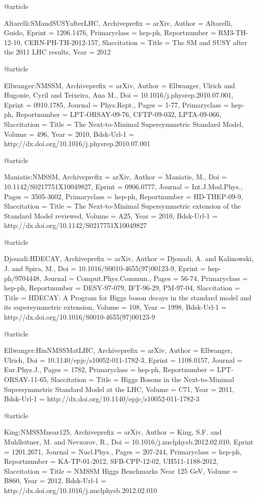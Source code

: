 {{{{{{{{{{{{{{@article{Altarelli:SMandSUSYafterLHC,
	Archiveprefix = {arXiv},
	Author = {Altarelli, Guido},
	Eprint = {1206.1476},
	Primaryclass = {hep-ph},
	Reportnumber = {RM3-TH-12-10, CERN-PH-TH-2012-157},
	Slaccitation = {%
	Title = {{The SM and SUSY after the 2011 LHC results}},
	Year = {2012}}

@article{Ellwanger:NMSSM,
	Archiveprefix = {arXiv},
	Author = {Ellwanger, Ulrich and Hugonie, Cyril and Teixeira, Ana M.},
	Doi = {10.1016/j.physrep.2010.07.001},
	Eprint = {0910.1785},
	Journal = {Phys.Rept.},
	Pages = {1-77},
	Primaryclass = {hep-ph},
	Reportnumber = {LPT-ORSAY-09-76, CFTP-09-032, LPTA-09-066},
	Slaccitation = {%
	Title = {{The Next-to-Minimal Supersymmetric Standard Model}},
	Volume = {496},
	Year = {2010},
	Bdsk-Url-1 = {http://dx.doi.org/10.1016/j.physrep.2010.07.001}}

@article{Maniatis:NMSSM,
	Archiveprefix = {arXiv},
	Author = {Maniatis, M.},
	Doi = {10.1142/S0217751X10049827},
	Eprint = {0906.0777},
	Journal = {Int.J.Mod.Phys.},
	Pages = {3505-3602},
	Primaryclass = {hep-ph},
	Reportnumber = {HD-THEP-09-9},
	Slaccitation = {%
	Title = {{The Next-to-Minimal Supersymmetric extension of the Standard Model reviewed}},
	Volume = {A25},
	Year = {2010},
	Bdsk-Url-1 = {http://dx.doi.org/10.1142/S0217751X10049827}}

@article{Djouadi:HDECAY,
	Archiveprefix = {arXiv},
	Author = {Djouadi, A. and Kalinowski, J. and Spira, M.},
	Doi = {10.1016/S0010-4655(97)00123-9},
	Eprint = {hep-ph/9704448},
	Journal = {Comput.Phys.Commun.},
	Pages = {56-74},
	Primaryclass = {hep-ph},
	Reportnumber = {DESY-97-079, IFT-96-29, PM-97-04},
	Slaccitation = {%
	Title = {{HDECAY: A Program for Higgs boson decays in the standard model and its supersymmetric extension}},
	Volume = {108},
	Year = {1998},
	Bdsk-Url-1 = {http://dx.doi.org/10.1016/S0010-4655(97)00123-9}}

@article{Ellwanger:HinNMSSMatLHC,
	Archiveprefix = {arXiv},
	Author = {Ellwanger, Ulrich},
	Doi = {10.1140/epjc/s10052-011-1782-3},
	Eprint = {1108.0157},
	Journal = {Eur.Phys.J.},
	Pages = {1782},
	Primaryclass = {hep-ph},
	Reportnumber = {LPT-ORSAY-11-65},
	Slaccitation = {%
	Title = {{Higgs Bosons in the Next-to-Minimal Supersymmetric Standard Model at the LHC}},
	Volume = {C71},
	Year = {2011},
	Bdsk-Url-1 = {http://dx.doi.org/10.1140/epjc/s10052-011-1782-3}}

@article{King:NMSSMnear125,
	Archiveprefix = {arXiv},
	Author = {King, S.F. and Muhlleitner, M. and Nevzorov, R.},
	Doi = {10.1016/j.nuclphysb.2012.02.010},
	Eprint = {1201.2671},
	Journal = {Nucl.Phys.},
	Pages = {207-244},
	Primaryclass = {hep-ph},
	Reportnumber = {KA-TP-01-2012, SFB-CPP-12-02, UH511-1188-2012},
	Slaccitation = {%
	Title = {{NMSSM Higgs Benchmarks Near 125 GeV}},
	Volume = {B860},
	Year = {2012},
	Bdsk-Url-1 = {http://dx.doi.org/10.1016/j.nuclphysb.2012.02.010}}

}}}}}}}}}}}}}}}}}}}}

